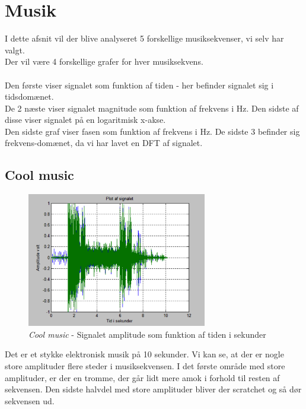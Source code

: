 \chapter{Musik}
I dette afsnit vil der blive analyseret 5 forskellige musiksekvenser, vi selv har valgt. \\
Der vil være 4 forskellige grafer for hver musiksekvens.\\ \\
Den første viser signalet som funktion af tiden - her befinder signalet sig i tidsdomænet. \\
De 2 næste viser signalet magnitude som funktion af frekvens i Hz. Den sidste af disse viser signalet på en logaritmisk x-akse. \\
Den sidste graf viser fasen som funktion af frekvens i Hz. De sidste 3 befinder sig frekvens-domænet, da vi har lavet en DFT af signalet.   

\section{Cool music}

\begin{figure}[H]
	\centering
	\includegraphics[width=0.7\textwidth]{Figurer/Snip20151001_3}
	\caption{\textit{Cool music} - Signalet amplitude som funktion af tiden i sekunder}
\end{figure}

Det er et stykke elektronisk musik på 10 sekunder. Vi kan se, at der er nogle store amplituder flere steder i musiksekvensen. I det første område med store amplituder, er der en tromme, der går lidt mere amok i forhold til resten af sekvensen. Den sidste halvdel med store amplituder bliver der scratchet og så dør sekvensen ud.

